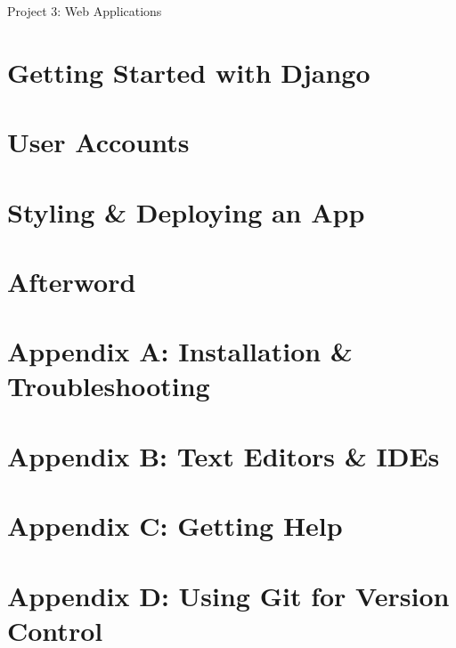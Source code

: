 \documentclass[oneside]{book}
\numberwithin{equation}{section}
\begin{document}

\begin{center}
	\Large Project 3: Web Applications
\end{center}

\section{Getting Started with Django}


\section{User Accounts}


\section{Styling \& Deploying an App}


\section*{Afterword}


\section{Appendix A: Installation \& Troubleshooting}


\section{Appendix B: Text Editors \& IDEs}


\section{Appendix C: Getting Help}


\section{Appendix D: Using Git for Version Control}



\printbibliography[heading=bibintoc]
	
\end{document}
